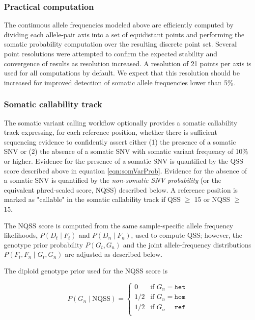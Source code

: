 \documentclass{article}
\begin{document}

\subsubsection{Practical computation}

The continuous allele frequencies modeled above are efficiently computed by dividing each allele-pair axis into a set of equidistant points and performing the somatic probability computation over the resulting discrete point set. Several point resolutions were attempted to confirm the expected stability and convergence of results as resolution increased. A resolution of 21 points per axis is used for all computations by default. We expect that this resolution should be increased for improved detection of somatic allele frequencies lower than 5\%.

\subsubsection{Somatic callability track}

The somatic variant calling workflow optionally provides a somatic callability track expressing, for each reference position, whether there is sufficient sequencing evidence to confidently assert either (1) the presence of a somatic SNV or (2) the absence of a somatic SNV with somatic variant frequency of 10\% or higher. Evidence for the presence of a somatic SNV is quantified by the QSS score described above in equation \ref{eqn:somVarProb}. Evidence for the absence of a somatic SNV is quantified by the \emph{non-somatic SNV probability} (or the equivalent phred-scaled score, NQSS) described below. A reference position is marked as "callable" in the somatic callability track if QSS $\ge$ 15 or NQSS $\ge$ 15.

The NQSS score is computed from the same sample-specific allele frequency likelihoods, $P(D_t \mid F_t)$ and $P(D_n \mid F_n)$, used to compute QSS; however, the genotype prior probability $P(G_t, G_n)$ and the joint allele-frequency distributions $P(F_t,F_n \mid G_t,G_n)$ are adjusted as described below.

The diploid genotype prior used for the NQSS score is

\begin{equation*}
P(G_n\mid \text{NQSS})=
\begin{cases}
0 & \text{if } G_n = \texttt{het} \\
1/2 & \text{if } G_n = \texttt{hom} \\
1/2 & \text{if } G_n = \texttt{ref} \\
\end{cases}
\end{equation*}
\end{document}
